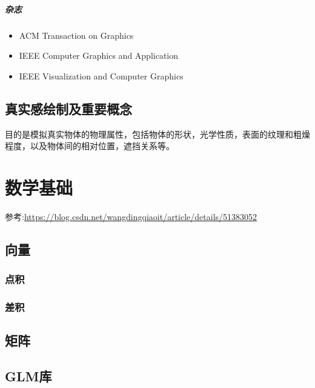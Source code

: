 \documentclass[UTF8,a4paper,12pt]{ctexbook}
\begin{document}
		\paragraph{杂志}
			\begin{itemize}
				\item ACM Transaction on Graphics
				\item IEEE Computer Graphics and Application
				\item IEEE Visualization and Computer Graphics
			\end{itemize}


	\section{真实感绘制及重要概念}
		目的是模拟真实物体的物理属性，包括物体的形状，光学性质，表面的纹理和粗燥程度，以及物体间的相对位置，遮挡关系等。
		


\chapter{数学基础}
	参考:\url{https://blog.csdn.net/wangdingqiaoit/article/details/51383052}
	\section{向量}
		\subsection{点积}
	
		\subsection{差积}
		
	
	\section{矩阵}
		
	
	
	
	\section{GLM库}
	
\end{document}
